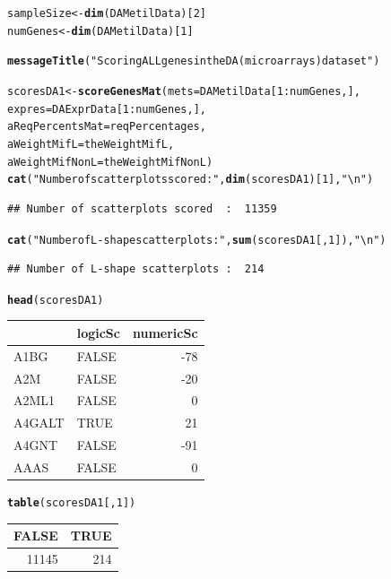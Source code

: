\documentclass[a4paper,10pt]{article}\usepackage[]{graphicx}\usepackage[]{xcolor}
\makeatletter
\newcommand{\hlnum}[1]{\textcolor[rgb]{0.686,0.059,0.569}{#1}}%
\newcommand{\hlstr}[1]{\textcolor[rgb]{0.192,0.494,0.8}{#1}}%
\newcommand{\hlopt}[1]{\textcolor[rgb]{0,0,0}{#1}}%
\newcommand{\hlstd}[1]{\textcolor[rgb]{0.345,0.345,0.345}{#1}}%
\newcommand{\hlkwb}[1]{\textcolor[rgb]{0.69,0.353,0.396}{#1}}%
\newcommand{\hlkwc}[1]{\textcolor[rgb]{0.333,0.667,0.333}{#1}}%
\newcommand{\hlkwd}[1]{\textcolor[rgb]{0.737,0.353,0.396}{\textbf{#1}}}%
\newenvironment{kframe}{%
 \def\at@end@of@kframe{}%
 \ifinner\ifhmode%
  \def\at@end@of@kframe{\end{minipage}}%
  \begin{minipage}{\columnwidth}%
 \fi\fi%
 \def\FrameCommand##1{\hskip\@totalleftmargin \hskip-\fboxsep
 \colorbox{shadecolor}{##1}\hskip-\fboxsep
     \hskip-\linewidth \hskip-\@totalleftmargin \hskip\columnwidth}%
 \MakeFramed {\advance\hsize-\width
   \@totalleftmargin\z@ \linewidth\hsize
   \@setminipage}}%
 {\par\unskip\endMakeFramed%
 \at@end@of@kframe}
\newenvironment{knitrout}{}{} %
\makeatother
\begin{document}
\begin{knitrout}
\color{fgcolor}\begin{kframe}
\begin{alltt}
\hlstd{sampleSize} \hlkwb{<-} \hlkwd{dim}\hlstd{(DAMetilData)[}\hlnum{2}\hlstd{]}
\hlstd{numGenes} \hlkwb{<-}   \hlkwd{dim}\hlstd{(DAMetilData)[}\hlnum{1}\hlstd{]}

\hlkwd{messageTitle}\hlstd{(}\hlstr{"Scoring ALL genes in the DA (microarrays) dataset"}\hlstd{)}

\hlstd{scoresDA1} \hlkwb{<-} \hlkwd{scoreGenesMat} \hlstd{(}\hlkwc{mets}\hlstd{=DAMetilData[}\hlnum{1}\hlopt{:}\hlstd{numGenes,],}
                                                        \hlkwc{expres}\hlstd{=DAExprData[}\hlnum{1}\hlopt{:}\hlstd{numGenes,],}
                            \hlkwc{aReqPercentsMat}\hlstd{=reqPercentages,}
                            \hlkwc{aWeightMifL}\hlstd{=theWeightMifL,}
                            \hlkwc{aWeightMifNonL}\hlstd{=theWeightMifNonL )}
\hlkwd{cat}\hlstd{(}\hlstr{"Number of scatterplots scored  : "}\hlstd{,} \hlkwd{dim}\hlstd{(scoresDA1)[}\hlnum{1}\hlstd{],}\hlstr{"\textbackslash{}n"}\hlstd{)}
\end{alltt}
\begin{verbatim}
## Number of scatterplots scored  :  11359
\end{verbatim}
\begin{alltt}
\hlkwd{cat}\hlstd{(}\hlstr{"Number of L-shape scatterplots : "}\hlstd{,} \hlkwd{sum}\hlstd{(scoresDA1[,}\hlnum{1}\hlstd{]),}\hlstr{"\textbackslash{}n"}\hlstd{)}
\end{alltt}
\begin{verbatim}
## Number of L-shape scatterplots :  214
\end{verbatim}
\begin{alltt}
\hlkwd{head}\hlstd{(scoresDA1)}
\end{alltt}
\end{kframe}


\begin{tabular}{l|l|r}
\hline
  & logicSc & numericSc\\
\hline
A1BG & FALSE & -78\\
\hline
A2M & FALSE & -20\\
\hline
A2ML1 & FALSE & 0\\
\hline
A4GALT & TRUE & 21\\
\hline
A4GNT & FALSE & -91\\
\hline
AAAS & FALSE & 0\\
\hline
\end{tabular}\begin{kframe}\begin{alltt}
\hlkwd{table}\hlstd{(scoresDA1[,}\hlnum{1}\hlstd{])}
\end{alltt}
\end{kframe}


\begin{tabular}{r|r}
\hline
FALSE & TRUE\\
\hline
11145 & 214\\
\hline
\end{tabular}
\end{knitrout}
\end{document}
